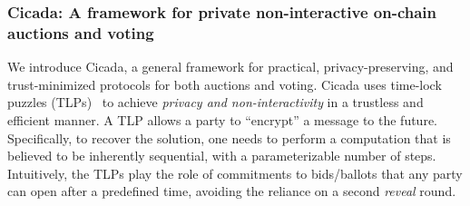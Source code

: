 \subsubsection{Cicada: A framework for private non-interactive on-chain auctions and voting}

We introduce Cicada, a general framework for practical, privacy-preserving, and trust-minimized protocols for both auctions and voting. 
Cicada uses time-lock puzzles (TLPs)~\cite{RSW96} to achieve \emph{privacy and non-interactivity} in a trustless and efficient manner.
A TLP allows a party to ``encrypt'' a message to the future. Specifically, to recover the solution, one needs to perform a computation that is believed to be inherently sequential, with a parameterizable number of steps.
Intuitively, the TLPs play the role of commitments to bids/ballots that any party can open after a predefined time, avoiding the reliance on a second \emph{reveal} round. 



